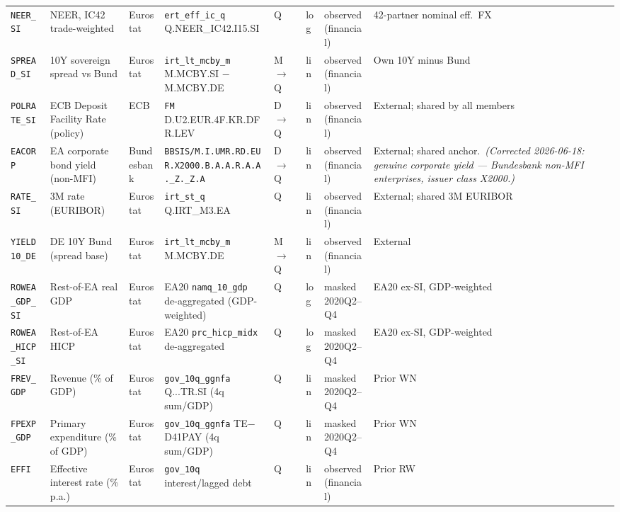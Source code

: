{\begin{longtable}{@{}p{1.9cm}p{2.9cm}p{1.5cm}p{2.7cm}p{0.7cm}p{1.0cm}p{1.6cm}p{2.4cm}@{}}
\texttt{NEER\_SI}     & NEER, IC42 trade-weighted         & Eurostat & \texttt{ert\_eff\_ic\_q} Q.NEER\_IC42.I15.SI           & Q & log & observed (financial) & 42-partner nominal eff.\ FX \\
\texttt{SPREAD\_SI}   & 10Y sovereign spread vs Bund      & Eurostat & \texttt{irt\_lt\_mcby\_m} M.MCBY.SI $-$ M.MCBY.DE      & M$\to$Q & lin & observed (financial) & Own 10Y minus Bund \\
\texttt{POLRATE\_SI}  & ECB Deposit Facility Rate (policy) & ECB & \texttt{FM} D.\allowbreak U2.\allowbreak EUR.\allowbreak 4F.\allowbreak KR.\allowbreak DFR.\allowbreak LEV                     & D$\to$Q & lin & observed (financial) & External; shared by all members \\
\texttt{EACORP}       & EA corporate bond yield (non-MFI)  & Bundesbank & \texttt{BBSIS/\allowbreak M.\allowbreak I.\allowbreak UMR.\allowbreak RD.\allowbreak EUR.\allowbreak X2000.\allowbreak B.A.A.\allowbreak R.A.A.\allowbreak \_Z.\_Z.A}       & D$\to$Q & lin & observed (financial) & External; shared anchor.\ \textit{(Corrected 2026-06-18: genuine corporate yield --- Bundesbank non-MFI enterprises, issuer class X2000.)} \\
\texttt{RATE\_SI}     & 3M rate (EURIBOR)                 & Eurostat & \texttt{irt\_st\_q} Q.IRT\_M3.EA                       & Q & lin & observed (financial) & External; shared 3M EURIBOR \\
\texttt{YIELD10\_DE}  & DE 10Y Bund (spread base)         & Eurostat & \texttt{irt\_lt\_mcby\_m} M.MCBY.DE                    & M$\to$Q & lin & observed (financial) & External \\
\texttt{ROWEA\_GDP\_SI} & Rest-of-EA real GDP             & Eurostat & EA20 \texttt{namq\_10\_gdp} de-aggregated (GDP-weighted) & Q & log & masked 2020Q2--Q4 & EA20 ex-SI, GDP-weighted \\
\texttt{ROWEA\_HICP\_SI} & Rest-of-EA HICP               & Eurostat & EA20 \texttt{prc\_hicp\_midx} de-aggregated            & Q & log & masked 2020Q2--Q4 & EA20 ex-SI, GDP-weighted \\
\texttt{FREV\_GDP}    & Revenue (\% of GDP)               & Eurostat & \texttt{gov\_10q\_ggnfa} Q...TR.SI (4q sum/GDP)        & Q & lin & masked 2020Q2--Q4 & Prior WN \\
\texttt{FPEXP\_GDP}   & Primary expenditure (\% of GDP)   & Eurostat & \texttt{gov\_10q\_ggnfa} TE$-$D41PAY (4q sum/GDP)      & Q & lin & masked 2020Q2--Q4 & Prior WN \\
\texttt{EFFI}         & Effective interest rate (\% p.a.) & Eurostat & \texttt{gov\_10q} interest/lagged debt                 & Q & lin & observed (financial) & Prior RW \\

\end{longtable}}
